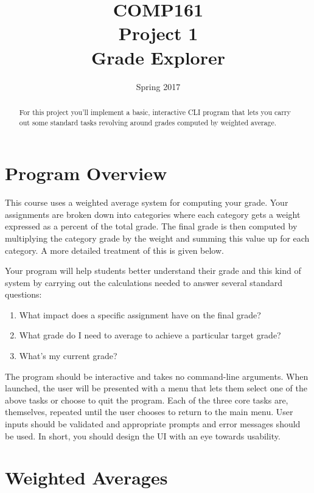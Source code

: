 \documentclass[]{tufte-handout}
\title{COMP161 \\ Project 1 \\ Grade Explorer}
\author{}
\date{Spring 2017}
\begin{document}
\maketitle

\begin{abstract}
For this project you'll implement a basic, interactive CLI program that lets you carry out some standard tasks revolving around grades computed by weighted average.
\end{abstract}

\section{Program Overview}

This course uses a weighted average system for computing your grade. Your assignments are broken down into categories where each category gets a weight expressed as a percent of the total grade. The final grade is then computed by multiplying the category grade by the weight and summing this value up for each category. A more detailed treatment of this is given below.

Your program will help students better understand their grade and this kind of system by carrying out the calculations needed to answer several standard questions:
\begin{enumerate}
  \item What impact does a specific assignment have on the final grade?
  \item What grade do I need to average to achieve a particular target grade?
  \item What's my current grade?
\end{enumerate}

The program should be interactive and takes no command-line arguments. When launched, the user will be presented with a menu that lets them select one of the above tasks or choose to quit the program. Each of the three core tasks are, themselves, repeated until the user chooses to return to the main menu. User inputs should be validated and appropriate prompts and error messages should be used. In short, you should design the UI with an eye towards usability.


\section{Weighted Averages}\label{sec:wAvg}
\end{document}
